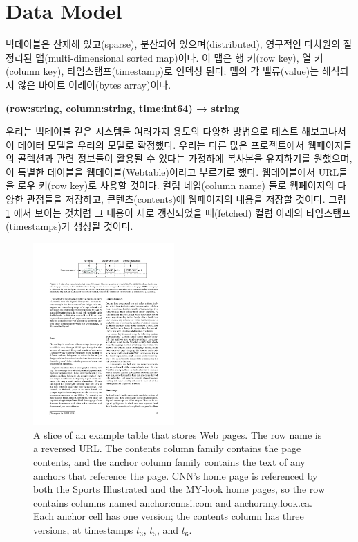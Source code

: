 \documentclass[twocolumn]{article}
\begin{document}
\section{Data Model}
빅테이블은 산재해 있고(sparse), 분산되어 있으며(distributed), 영구적인 다차원의 잘 정리된 맵(multi-dimensional sorted map)이다. 이 맵은 행 키(row key), 열 키(column key), 타임스탬프(timestamp)로 인덱싱 된다; 맵의 각 밸류(value)는 해석되지 않은 바이트 어레이(bytes array)이다.

{\small \bf
(row:string, column:string, time:int64) → string
}

우리는 빅테이블 같은 시스템을 여러가지 용도의 다양한 방법으로 테스트 해보고나서 이 데이터 모델을 우리의 모델로 확정했다. 우리는 다른 많은 프로젝트에서 웹페이지들의 콜렉션과 관련 정보들이 활용될 수 있다는 가정하에 복사본을 유지하기를 원했으며, 이 특별한 테이블을 웹테이블(Webtable)이라고 부르기로 했다. 웹테이블에서 URL들을 로우 키(row key)로 사용할 것이다. 컬럼 네임(column name) 들로 웹페이지의 다양한 관점들을 저장하고, 콘텐츠(contents)에 웹페이지의 내용을 저장할 것이다. 그림 \ref{fig01} 에서 보이는 것처럼 그 내용이 새로 갱신되었을 때(fetched) 컬럼 아래의 타임스탬프(timestamps)가 생성될 것이다.

\begin{figure}[htb]
        \centering
        \includegraphics[width=0.48\textwidth]{concept}
        \caption{\small A slice of an example table that stores Web pages. The row name is a reversed URL. The contents column family contains the page contents, and the anchor column family contains the text of any anchors that reference the page. CNN’s home page is referenced by both the Sports Illustrated and the MY-look home pages, so the row contains columns named anchor:cnnsi.com and anchor:my.look.ca. Each anchor cell has one version; the contents column has three versions, at timestamps $t_3$, $t_5$, and $t_6$.}
        \label{fig01}
\end{figure}
\end{document}

